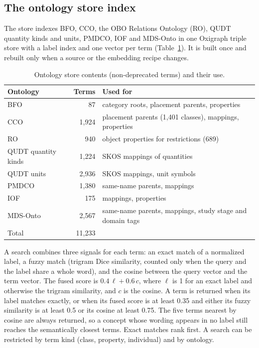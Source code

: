 \subsection{The ontology store index}

The store indexes BFO, CCO, the OBO Relations Ontology (RO), QUDT quantity kinds and units, PMDCO, IOF and MDS-Onto in one Oxigraph triple store with a label index and one vector per term (Table~\ref{tab:store}). It is built once and rebuilt only when a source or the embedding recipe changes.

\begin{table}[t]
\centering
\caption{Ontology store contents (non-deprecated terms) and their use.}\label{tab:store}
\small
\begin{tabular}{p{2.2cm}rp{3.6cm}}
\hline
Ontology & Terms & Used for \\
\hline
BFO & 87 & category roots, placement parents, properties \\
CCO & 1,924 & placement parents (1,401 classes), mappings, properties \\
RO & 940 & object properties for restrictions (689) \\
QUDT quantity kinds & 1,224 & SKOS mappings of quantities \\
QUDT units & 2,936 & SKOS mappings, unit symbols \\
PMDCO & 1,380 & same-name parents, mappings \\
IOF & 175 & mappings, properties \\
MDS-Onto & 2,567 & same-name parents, mappings, study stage and domain tags \\
\hline
Total & 11,233 & \\
\hline
\end{tabular}
\end{table}

A search combines three signals for each term: an exact match of a normalized label, a fuzzy match (trigram Dice similarity, counted only when the query and the label share a whole word), and the cosine between the query vector and the term vector. The fused score is $0.4\,\ell + 0.6\,c$, where $\ell$ is 1 for an exact label and otherwise the trigram similarity, and $c$ is the cosine. A term is returned when its label matches exactly, or when its fused score is at least 0.35 and either its fuzzy similarity is at least 0.5 or its cosine at least 0.75. The five terms nearest by cosine are always returned, so a concept whose wording appears in no label still reaches the semantically closest terms. Exact matches rank first. A search can be restricted by term kind (class, property, individual) and by ontology.

